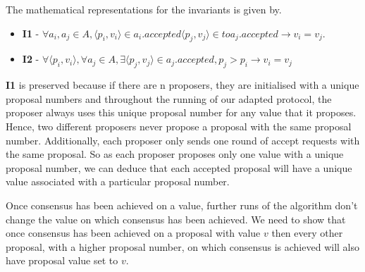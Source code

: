 The mathematical representations for the invariants is given by.
\begin{itemize}
  \item \textbf{I1} - $\forall a_i, a_j \in A, \langle p_i, v_i \rangle \in a_{i}.accepted
  \langle p_j, v_j \rangle \in to a_{j}.accepted \rightarrow v_i = v_j$.
  \item \textbf{I2} - $\forall \langle p_i, v_i \rangle,
    \forall a_j \in A, \exists \langle p_j, v_j \rangle \in a_{j}.accepted,
    p_j > p_i \rightarrow v_i = v_j$
\end{itemize}

\textbf{I1} is preserved because if there are n proposers, they are
initialised with a unique proposal numbers and throughout the running of our
adapted protocol, the proposer always uses this unique proposal number for any
value that it proposes. Hence, two different proposers never propose a proposal
with the same proposal number. Additionally, each proposer only sends one round
of accept requests with the same proposal. So as each proposer proposes only one
value with a unique proposal number, we can deduce that each accepted proposal
will have a unique value associated with a particular proposal number.

%

Once consensus has been achieved on a value, further runs of the algorithm don't
change the value on which consensus has been achieved.
We need to show that once consensus has been achieved
on a proposal with value $v$ then every other proposal, with a higher
proposal number, on which consensus is achieved will also have
proposal value set to $v$.

